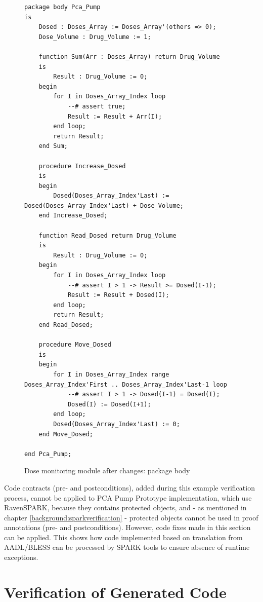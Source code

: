 \begin{figure}
\singlespacing
\begin{lstlisting}[frame=single, gobble=0]
package body Pca_Pump
is
    Dosed : Doses_Array := Doses_Array'(others => 0);
    Dose_Volume : Drug_Volume := 1;

    function Sum(Arr : Doses_Array) return Drug_Volume
    is
        Result : Drug_Volume := 0;
    begin
        for I in Doses_Array_Index loop
            --# assert true;
            Result := Result + Arr(I);
        end loop;
        return Result;
    end Sum;

    procedure Increase_Dosed
    is
    begin
        Dosed(Doses_Array_Index'Last) := Dosed(Doses_Array_Index'Last) + Dose_Volume;
    end Increase_Dosed;

    function Read_Dosed return Drug_Volume
    is
        Result : Drug_Volume := 0;
    begin
        for I in Doses_Array_Index loop
            --# assert I > 1 -> Result >= Dosed(I-1);
            Result := Result + Dosed(I);
        end loop;
        return Result;
    end Read_Dosed;

    procedure Move_Dosed
    is
    begin
        for I in Doses_Array_Index range Doses_Array_Index'First .. Doses_Array_Index'Last-1 loop
            --# assert I > 1 -> Dosed(I-1) = Dosed(I);
            Dosed(I) := Dosed(I+1);
        end loop;
        Dosed(Doses_Array_Index'Last) := 0;
    end Move_Dosed;

end Pca_Pump;
\end{lstlisting}
\doublespacing
\caption{Dose monitoring module after changes: package body}
\label{listing:pcapump_dosemonitor:spark2005_body}
\end{figure}

Code contracts (pre- and postconditions), added during this example verification process, cannot be applied to PCA Pump Prototype implementation, which use RavenSPARK, because they contains protected objects, and - as mentioned in chapter \ref{background:sparkverification} - protected objects cannot be used in proof annotations (pre- and postconditions). However, code fixes made in this section can be applied. This shows how code implemented based on translation from AADL/BLESS can be processed by SPARK tools to ensure absence of runtime exceptions.



\section{Verification of Generated Code}
\label{verification:generated}

